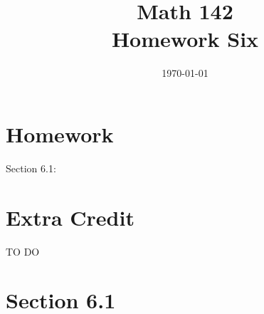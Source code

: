 \documentclass{exam}
\author{}
\date{\today}
\title{Math 142 \\ Homework Six}
\begin{document}
  \maketitle

  \section{Homework}
  Section 6.1: 

  \section{Extra Credit}
  TO DO

  \ifprintanswers

    \pagebreak

    \section{Section 6.1}
\end{document}
